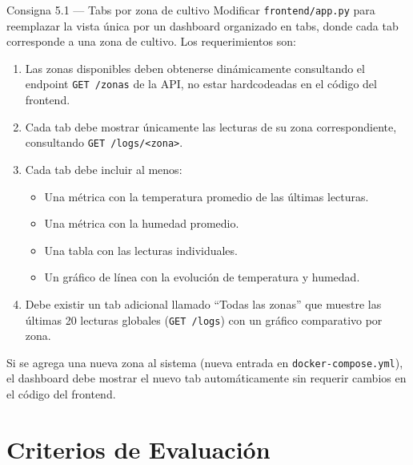 \documentclass[12pt,a4paper]{article}
\begin{document}
\begin{consigna}{Consigna 5.1 — Tabs por zona de cultivo}
Modificar \texttt{frontend/app.py} para reemplazar la vista única por un
dashboard organizado en tabs, donde cada tab corresponde a una zona de cultivo.
Los requerimientos son:

\begin{enumerate}
  \item Las zonas disponibles deben obtenerse dinámicamente consultando
        el endpoint \texttt{GET /zonas} de la API, no estar hardcodeadas
        en el código del frontend.
  \item Cada tab debe mostrar únicamente las lecturas de su zona correspondiente,
        consultando \texttt{GET /logs/<zona>}.
  \item Cada tab debe incluir al menos:
        \begin{itemize}
          \item Una métrica con la temperatura promedio de las últimas lecturas.
          \item Una métrica con la humedad promedio.
          \item Una tabla con las lecturas individuales.
          \item Un gráfico de línea con la evolución de temperatura y humedad.
        \end{itemize}
  \item Debe existir un tab adicional llamado ``Todas las zonas'' que muestre
        las últimas 20 lecturas globales (\texttt{GET /logs}) con un gráfico
        comparativo por zona.
\end{enumerate}

Si se agrega una nueva zona al sistema (nueva entrada en \texttt{docker-compose.yml}),
el dashboard debe mostrar el nuevo tab automáticamente sin requerir cambios en
el código del frontend.
\end{consigna}

\section{Criterios de Evaluación}
\end{document}
